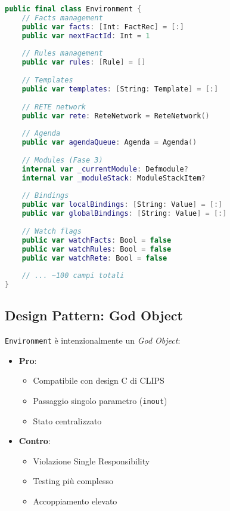 \begin{lstlisting}[language=Swift]
public final class Environment {
    // Facts management
    public var facts: [Int: FactRec] = [:]
    public var nextFactId: Int = 1
    
    // Rules management
    public var rules: [Rule] = []
    
    // Templates
    public var templates: [String: Template] = [:]
    
    // RETE network
    public var rete: ReteNetwork = ReteNetwork()
    
    // Agenda
    public var agendaQueue: Agenda = Agenda()
    
    // Modules (Fase 3)
    internal var _currentModule: Defmodule?
    internal var _moduleStack: ModuleStackItem?
    
    // Bindings
    public var localBindings: [String: Value] = [:]
    public var globalBindings: [String: Value] = [:]
    
    // Watch flags
    public var watchFacts: Bool = false
    public var watchRules: Bool = false
    public var watchRete: Bool = false
    
    // ... ~100 campi totali
}
\end{lstlisting}

\subsection{Design Pattern: God Object}

\texttt{Environment} è intenzionalmente un \textit{God Object}:

\begin{itemize}
\item \textbf{Pro}:
  \begin{itemize}
  \item Compatibile con design C di CLIPS
  \item Passaggio singolo parametro (\texttt{inout})
  \item Stato centralizzato
  \end{itemize}
\item \textbf{Contro}:
  \begin{itemize}
  \item Violazione Single Responsibility
  \item Testing più complesso
  \item Accoppiamento elevato
  \end{itemize}
\end{itemize}

